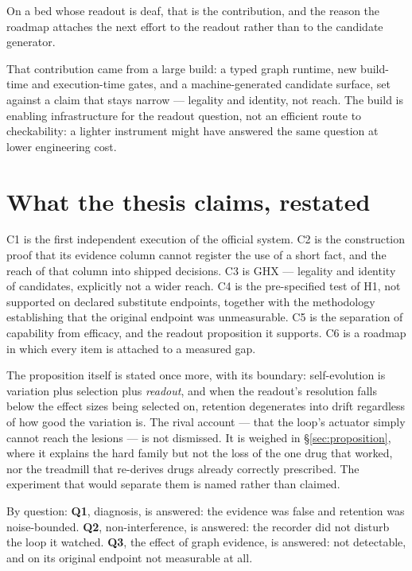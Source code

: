 On a bed whose readout is deaf, that is the contribution, and the reason
the roadmap attaches the next effort to the readout rather than to the
candidate generator.

That contribution came from a large build: a typed graph runtime, new
build-time and execution-time gates, and a machine-generated candidate
surface, set against a claim that stays narrow --- legality and identity,
not reach. The build is enabling infrastructure for the readout question,
not an efficient route to checkability: a lighter instrument might have
answered the same question at lower engineering cost.

\section*{What the thesis claims, restated}

C1 is the first independent execution of the official system. C2 is the
construction proof that its evidence column cannot register the use of a
short fact, and the reach of that column into shipped decisions. C3 is GHX
--- legality and identity of candidates, explicitly not a wider reach. C4
is the pre-specified test of H1, not supported on declared substitute
endpoints, together with the methodology establishing that the original
endpoint was unmeasurable. C5 is the separation of capability from
efficacy, and the readout proposition it supports. C6 is a roadmap in which
every item is attached to a measured gap.

The proposition itself is stated once more, with its boundary:
self-evolution is variation plus selection plus \emph{readout}, and when
the readout's resolution falls below the effect sizes being selected on,
retention degenerates into drift regardless of how good the variation is.
The rival account --- that the loop's actuator simply cannot reach the
lesions --- is not dismissed. It is weighed in \S\ref{sec:proposition},
where it explains the hard family but not the loss of the one drug that
worked, nor the treadmill that re-derives drugs already correctly
prescribed. The experiment that would separate them is named rather than
claimed.

By question: \textbf{Q1}, diagnosis, is answered: the evidence was false
and retention was noise-bounded. \textbf{Q2}, non-interference, is
answered: the recorder did not disturb the loop it watched. \textbf{Q3},
the effect of graph evidence, is answered: not detectable, and on its
original endpoint not measurable at all.

